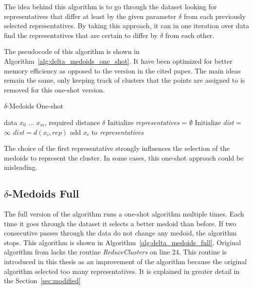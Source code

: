 \documentclass[thesis=B,english]{FITthesis}[2012/10/20]
\begin{document}
The idea behind this algorithm is to go through the dataset looking for representatives that differ at least by the given parameter $\delta$ from each previously selected representatives.
By taking this approach, it can in one iteration over data find the representatives that are certain to differ by $\delta$ from each other.

The pseudocode of this algorithm is shown in Algorithm~\ref{alg:delta_medoids_one_shot}.
It have been optimized for better memory efficiency as opposed to the version in the cited paper.
The main ideas remain the same, only keeping track of clusters that the points are assigned to is removed for this one-shot version.

\begin{algorithm}
    \caption{$\delta$-Medoids One-shot}
    \label{alg:delta_medoids_one_shot}
    \begin{algorithmic}[1]
        \INPUT data $x_0$ ... $x_m$, required distance $\delta$
        \STATE Initialize \textit{representatives} = $\emptyset$
            \STATE Initialize \textit{dist} = $\infty$
                    \STATE $dist = d(x_i, rep)$
                \ENDIF
            \ENDFOR
                \STATE add $x_i$ to \textit{representatives}
            \ENDIF
        \ENDFOR
    \end{algorithmic}
\end{algorithm}


The choice of the first representative strongly influences the selection of the medoids to represent the cluster.
In some cases, this one-shot approach could be misleading.

\subsection{$\delta$-Medoids Full}

The full version of the algorithm runs a one-shot algorithm multiple times.
Each time it goes through the dataset it selects a better medoid than before.
If two consecutive passes through the data do not change any medoid, the algorithm stops.
This algorithm is shown in Algorithm~\ref{alg:delta_medoids_full}.
Original algorithm from \cite{liebman2015representative} lacks the routine \textit{ReduceClusters} on line 24.
This routine is introduced in this thesis as an improvement of the algorithm because the original algorithm selected too many representatives.
It is explained in greater detail in the Section~\ref{sec:modified}
\end{document}

